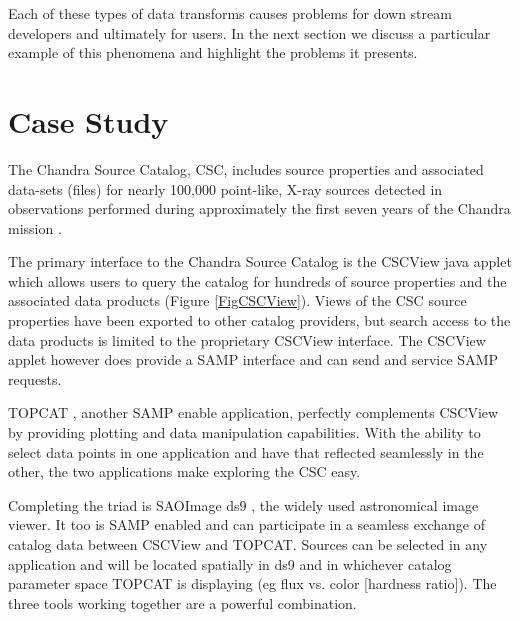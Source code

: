 Each of these types of data transforms causes problems for down stream
developers and ultimately for users. In the next section we discuss a
particular example of this phenomena and highlight the problems it presents.







\section{Case Study}




The Chandra Source Catalog, CSC,  includes source properties and 
associated data-sets (files) for nearly 100,000 point-like, X-ray sources 
detected in observations performed during approximately the first 
seven years of the Chandra mission \citep{2010ApJS..189...37E}. 


The primary interface to the Chandra Source Catalog is the CSCView java 
applet \citep{2011ASPC..442..649V}
 which allows users to query the 
catalog for hundreds of source properties and the associated
 data products (Figure \ref{FigCSCView}).
Views of the CSC source properties have been 
exported to other catalog providers, but search access to the data 
products is limited to the proprietary CSCView interface.  The CSCView 
applet however does provide a SAMP \citep{2011arXiv1110.0528T} interface and can send and 
service SAMP requests.

TOPCAT \citep{2005ASPC..347...29T}, another SAMP enable application, perfectly complements CSCView 
by providing
plotting and data manipulation capabilities.  With the ability to select
data points in one application and have that reflected seamlessly in the other,
the two applications make exploring the CSC easy.  

Completing the triad is SAOImage ds9 \citep{2003ASPC..295..489J}, the widely used astronomical image viewer. 
It too is SAMP enabled and can participate in a seamless exchange 
of catalog data between CSCView and TOPCAT.  Sources can be selected in any
application and will be located spatially in ds9 and in whichever catalog
parameter space TOPCAT is displaying (eg flux vs. color [hardness ratio]).
The three tools working together are a powerful combination.  

